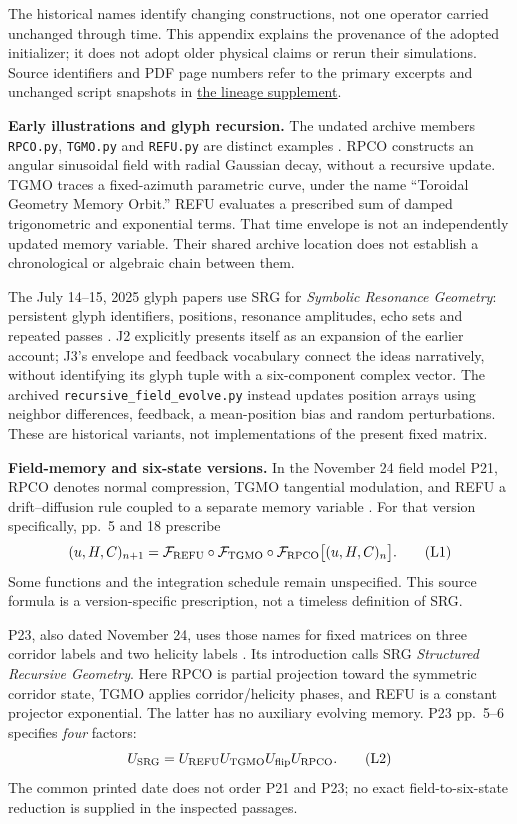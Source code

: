 \documentclass[11pt,a4paper]{article}
\begin{document}
The historical names identify changing constructions, not one operator carried unchanged through time. This appendix explains the provenance of the adopted initializer; it does not adopt older physical claims or rerun their simulations. Source identifiers and PDF page numbers refer to the primary excerpts and unchanged script snapshots in \href{\detokenize{supplement/lineage/LINEAGE_LEDGER.md}}{the lineage supplement}.

\textbf{Early illustrations and glyph recursion.}
The undated archive members \texttt{RPCO.py}, \texttt{TGMO.py} and \texttt{REFU.py} are distinct examples \cite{earlyScripts}. RPCO constructs an angular sinusoidal field with radial Gaussian decay, without a recursive update. TGMO traces a fixed-azimuth parametric curve, under the name \textquotedblleft{}Toroidal Geometry Memory Orbit.\textquotedblright{} REFU evaluates a prescribed sum of damped trigonometric and exponential terms. That time envelope is not an independently updated memory variable. Their shared archive location does not establish a chronological or algebraic chain between them.

The July 14--15, 2025 glyph papers use SRG for \emph{Symbolic Resonance Geometry}: persistent glyph identifiers, positions, resonance amplitudes, echo sets and repeated passes \cite{glyphSRG}. J2 explicitly presents itself as an expansion of the earlier account; J3's envelope and feedback vocabulary connect the ideas narratively, without identifying its glyph tuple with a six-component complex vector. The archived \texttt{recursive\_field\_evolve.py} instead updates position arrays using neighbor differences, feedback, a mean-position bias and random perturbations. These are historical variants, not implementations of the present fixed matrix.

\textbf{Field-memory and six-state versions.}
In the November 24 field model P21, RPCO denotes normal compression, TGMO tangential modulation, and REFU a drift--diffusion rule coupled to a separate memory variable \cite{fieldRecursion}. For that version specifically, pp.~5 and 18 prescribe
\[
(u,H,C)_{n+1}=
 \mathcal F_{\rm REFU}\circ\mathcal F_{\rm TGMO}\circ
 \mathcal F_{\rm RPCO}\bigl[(u,H,C)_n\bigr].
\tag{L1}\label{eq:L1}
\]
Some functions and the integration schedule remain unspecified. This source formula is a version-specific prescription, not a timeless definition of SRG.

P23, also dated November 24, uses those names for fixed matrices on three corridor labels and two helicity labels \cite{sixStateSRG}. Its introduction calls SRG \emph{Structured Recursive Geometry}. Here RPCO is partial projection toward the symmetric corridor state, TGMO applies corridor/helicity phases, and REFU is a constant projector exponential. The latter has no auxiliary evolving memory. P23 pp.~5--6 specifies \emph{four} factors:
\[
 U_{\rm SRG}=U_{\rm REFU}U_{\rm TGMO}U_{\rm flip}U_{\rm RPCO}.
\tag{L2}\label{eq:L2}
\]
The common printed date does not order P21 and P23; no exact field-to-six-state reduction is supplied in the inspected passages.
\end{document}
